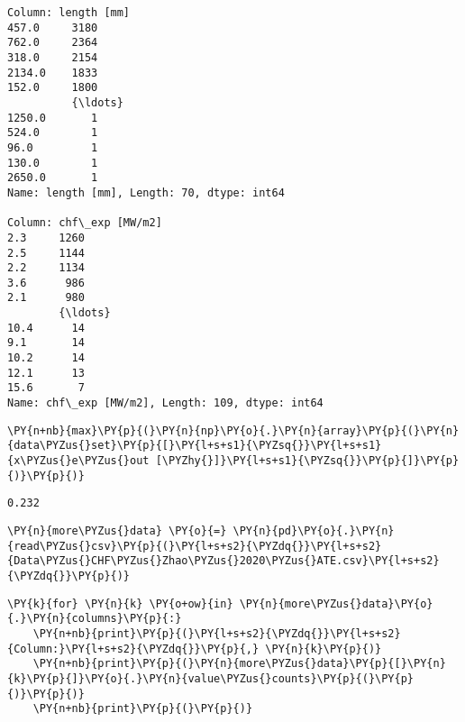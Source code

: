 \begin{Verbatim}[commandchars=\\\{\}]
Column: length [mm]
457.0     3180
762.0     2364
318.0     2154
2134.0    1833
152.0     1800
          {\ldots}
1250.0       1
524.0        1
96.0         1
130.0        1
2650.0       1
Name: length [mm], Length: 70, dtype: int64

Column: chf\_exp [MW/m2]
2.3     1260
2.5     1144
2.2     1134
3.6      986
2.1      980
        {\ldots}
10.4      14
9.1       14
10.2      14
12.1      13
15.6       7
Name: chf\_exp [MW/m2], Length: 109, dtype: int64

    \end{Verbatim}

    \begin{tcolorbox}[breakable, size=fbox, boxrule=1pt, pad at break*=1mm,colback=cellbackground, colframe=cellborder]
\begin{Verbatim}[commandchars=\\\{\}]
\PY{n+nb}{max}\PY{p}{(}\PY{n}{np}\PY{o}{.}\PY{n}{array}\PY{p}{(}\PY{n}{data\PYZus{}set}\PY{p}{[}\PY{l+s+s1}{\PYZsq{}}\PY{l+s+s1}{x\PYZus{}e\PYZus{}out [\PYZhy{}]}\PY{l+s+s1}{\PYZsq{}}\PY{p}{]}\PY{p}{)}\PY{p}{)}
\end{Verbatim}
\end{tcolorbox}

            \begin{tcolorbox}[breakable, size=fbox, boxrule=.5pt, pad at break*=1mm, opacityfill=0]
\begin{Verbatim}[commandchars=\\\{\}]
0.232
\end{Verbatim}
\end{tcolorbox}
        
    \begin{tcolorbox}[breakable, size=fbox, boxrule=1pt, pad at break*=1mm,colback=cellbackground, colframe=cellborder]
\begin{Verbatim}[commandchars=\\\{\}]
\PY{n}{more\PYZus{}data} \PY{o}{=} \PY{n}{pd}\PY{o}{.}\PY{n}{read\PYZus{}csv}\PY{p}{(}\PY{l+s+s2}{\PYZdq{}}\PY{l+s+s2}{Data\PYZus{}CHF\PYZus{}Zhao\PYZus{}2020\PYZus{}ATE.csv}\PY{l+s+s2}{\PYZdq{}}\PY{p}{)}
\end{Verbatim}
\end{tcolorbox}

    \begin{tcolorbox}[breakable, size=fbox, boxrule=1pt, pad at break*=1mm,colback=cellbackground, colframe=cellborder]
\begin{Verbatim}[commandchars=\\\{\}]
\PY{k}{for} \PY{n}{k} \PY{o+ow}{in} \PY{n}{more\PYZus{}data}\PY{o}{.}\PY{n}{columns}\PY{p}{:}
    \PY{n+nb}{print}\PY{p}{(}\PY{l+s+s2}{\PYZdq{}}\PY{l+s+s2}{Column:}\PY{l+s+s2}{\PYZdq{}}\PY{p}{,} \PY{n}{k}\PY{p}{)}
    \PY{n+nb}{print}\PY{p}{(}\PY{n}{more\PYZus{}data}\PY{p}{[}\PY{n}{k}\PY{p}{]}\PY{o}{.}\PY{n}{value\PYZus{}counts}\PY{p}{(}\PY{p}{)}\PY{p}{)}
    \PY{n+nb}{print}\PY{p}{(}\PY{p}{)}
\end{Verbatim}
\end{tcolorbox}

